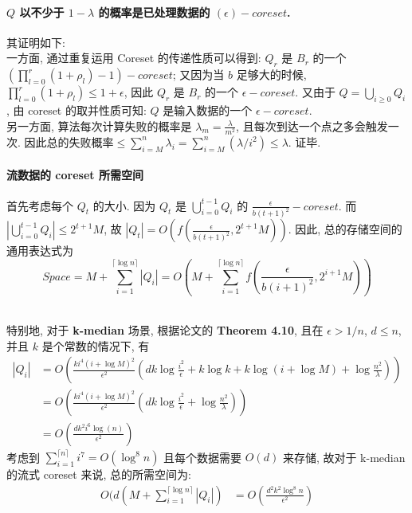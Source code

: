 \documentclass[UTF8]{article}
\newcommand{\jumpLine} {\hspace*{\fill} \par}
\begin{document}
\paragraph{$Q$ 以不少于 $1-\lambda$ 的概率是已处理数据的 $(\epsilon)-coreset$.} 其证明如下:\\
一方面, 通过重复运用 Coreset 的传递性质可以得到: $Q_r$ 是 $B_r$ 的一个 $(\prod\limits_{l=0}^r(1+\rho_l)-1)-coreset$; 又因为当 $b$ 足够大的时候,  $\prod\limits_{l=0}^r(1+\rho_l) \le 1 + \epsilon$, 因此 $Q_r$ 是 $B_r$ 的一个 $\epsilon-coreset$. 又由于 $Q=\bigcup\limits_{i\ge 0} Q_i$, 由 coreset 的取并性质可知: $Q$ 是输入数据的一个 $\epsilon-coreset$. \\
另一方面, 算法每次计算失败的概率是 $\lambda_m=\frac{\lambda}{m^2}$, 且每次到达一个点之多会触发一次. 因此总的失败概率$\le \sum\limits_{i=M}^n\lambda_i=\sum\limits_{i=M}^n(\lambda/i^2)\le \lambda$. 证毕.
\\\jumpLine\noindent
\paragraph{流数据的 coreset 所需空间} 首先考虑每个 $Q_t$ 的大小. 因为 $Q_t$ 是 $\bigcup\limits_{i=0}^{t-1} Q_i$ 的 $\frac{\epsilon}{b(t+1)^2}-coreset$. 而 $\left|\bigcup\limits_{i=0}^{t-1} Q_i\right| \le 2^{t+1} M$, 故 $|Q_t| = O(f(\frac{\epsilon}{b(t+1)^2}, 2^{t+1} M))$. 因此, 总的存储空间的通用表达式为
$$Space = M + \sum\limits_{i=1}^{\lceil\log n\rceil} |Q_i| = O\left(M + \sum\limits_{i=1}^{\lceil\log n\rceil} f\left(\frac{\epsilon}{b(i+1)^2}, 2^{i+1} M\right)\right)$$
\\\jumpLine\noindent
特别地, 对于 \textbf{k-median} 场景, 根据论文的 \textbf{Theorem 4.10}, 且在 $\epsilon > 1/n$, $d \le n$, 并且 $k$ 是个常数的情况下, 有
$$\begin{aligned}
	|Q_i| &= O\left( \frac{k i^4(i+\log M)^2}{\epsilon^2}\left( dk\log\frac{i^2}{\epsilon} + k\log k + k\log(i+\log M) + \log\frac{n^2}{\lambda} \right) \right) \\
	&=O\left( \frac{k i^4(i+\log M)^2}{\epsilon^2}\left( dk\log\frac{i^2}{\epsilon} + \log\frac{n^2}{\lambda} \right) \right) \\
	&=O\left( \frac{dk^2 i^6\log (n)}{\epsilon^2} \right)
\end{aligned}$$
考虑到 $\sum\limits_{i=1}^{\lceil n \rceil}i^7=O(\log^8 n)$ 且每个数据需要 $O(d)$ 来存储, 故对于 k-median 的流式 coreset 来说, 总的所需空间为:
$$\begin{aligned}
	O(d(M + \sum\limits_{i=1}^{\lceil \log n \rceil}|Q_i|) &= O\left( \frac{d^2k^2 \log ^8 n}{\epsilon^2} \right)
\end{aligned}$$
\\\jumpLine\noindent
\end{document}
